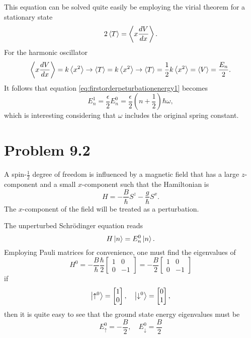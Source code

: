 \documentclass[11pt]{amsart}
\begin{document}
This equation can be solved quite easily be employing the virial theorem for a stationary state
\begin{equation}
\label{eq:virial}
2\ev{T} = \ev{x\frac{dV}{dx}}.
\end{equation}
For the harmonic oscillator
\begin{equation*}
\ev{x\frac{dV}{dx}}= k \ev{x^2} \rightarrow \ev{T} =  k \ev{x^2} \rightarrow \ev{T} = \frac{1}{2}k\ev{x^2} = \ev{V} = \frac{E_n}{2}.
\end{equation*}
It follows that equation \ref{eq:firstorderpeturbationenergy1} becomes
\begin{equation}
E_n^1 = \frac{\epsilon}{2}E_n^0 = \frac{\epsilon}{2}\left(n + \frac{1}{2} \right) \hbar \omega,
\end{equation}
which is interesting considering that $\omega$ includes the original spring constant.

\section*{Problem 9.2}
A spin-$\frac{1}{2}$ degree of freedom is influenced by a magnetic field that has a large $z$-component and a small $x$-component such that the Hamiltonian is
\begin{equation}
\label{eq:magHam}
H = -\frac{B}{\hbar}S^z-\frac{g}{\hbar}S^x.
\end{equation}
The $x$-component of the field will be treated as a perturbation.

The unperturbed Schrödinger equation reads 
\begin{equation}
H\ket{n} = E_n^0\ket{n}.
\end{equation}
Employing Pauli matrices for convenience, one must find the eigenvalues of
\begin{equation}
H^0=-\frac{B}{\hbar}\frac{\hbar}{2}
\begin{bmatrix}
1 & 0 \\
0 & -1
\end{bmatrix}
= -\frac{B}{2}
\begin{bmatrix}
1 & 0 \\
0 & -1
\end{bmatrix}
\end{equation}
if
\begin{equation}
\ket{\uparrow^0} = 
\begin{bmatrix}
1 \\ 0
\end{bmatrix}, \quad
\ket{\downarrow^0} = 
\begin{bmatrix}
0 \\ 1
\end{bmatrix},
\end{equation}
then it is quite easy to see that the ground state energy eigenvalues must be
\begin{equation}
E_\uparrow^0 = -\frac{B}{2}, \quad E_\downarrow^0 = \frac{B}{2}
\end{equation}
\end{document}
